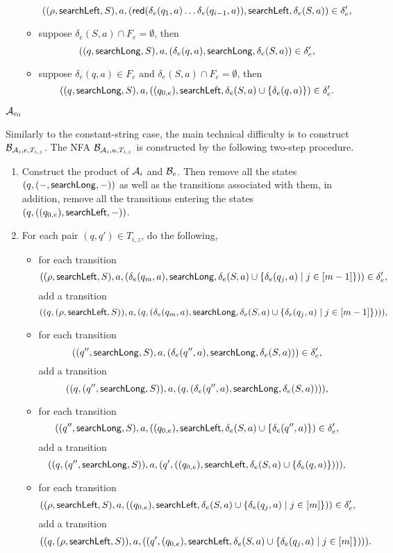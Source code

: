 \begin{itemize}
\begin{itemize}
{		$$((\rho, \mathsf{searchLeft}, S), a, (\mathsf{red}(\delta_e(q_1,a) \dots \delta_e(q_{i-1},a)), \mathsf{searchLeft}, \delta_e(S,a)) \in  \delta'_e,$$ 
%
}
		\item suppose $\delta_e(S,a) \cap F_e = \emptyset$, then 
		$$((q, \mathsf{searchLong}, S), a, (\delta_e(q,a), \mathsf{searchLong}, \delta_e(S,a)) \in \delta'_e,$$
		\item suppose $\delta_e(q,a) \in F_e$ and $\delta_e(S,a) \cap F_e = \emptyset$, then 
		$$((q, \mathsf{searchLong}, S), a, ((q_{0,e}), \mathsf{searchLeft}, \delta_e(S,a) \cup \{\delta_e(q,a)\}) \in \delta'_e.$$
	\end{itemize}
\end{itemize}

\begin{example}
$\mathcal{A}_{e_0}$
\end{example}


Similarly to the constant-string case, the main technical difficulty is to construct $\mathcal{B}_{\mathcal{A}_i, e,  T_{i, z}}$. The NFA $\mathcal{B}_{\mathcal{A}_i, u,  T_{i, z}}$ is constructed by the following two-step procedure.
\begin{enumerate}
\item Construct the product of $\mathcal{A}_i$ and $\mathcal{B}_e$. Then remove all the states $(q, (-, \mathsf{searchLong}, -))$ as well as the transitions associated with them, in addition, remove all the transitions entering the states $(q, ((q_{0,e}), \mathsf{searchLeft},-))$.

\item For each pair $(q,q') \in T_{i,z}$, do the following,
\begin{itemize}
\item for each transition
$$((\rho, \mathsf{searchLeft}, S), a, (\delta_e(q_m, a), \mathsf{searchLong}, \delta_e(S,a) \cup \{\delta_e(q_j, a) \mid j \in [m-1]\})) \in \delta'_e,$$
add a transition
$$((q, (\rho, \mathsf{searchLeft}, S)), a, (q, (\delta_e(q_m, a), \mathsf{searchLong}, \delta_e(S,a) \cup \{\delta_e(q_j, a) \mid j \in [m-1]\}))),$$
%
\item for each transition 
$$((q'', \mathsf{searchLong}, S), a, (\delta_e(q'', a), \mathsf{searchLong}, \delta_e(S,a))) \in \delta'_e,$$  
add a transition 
$$((q, (q'', \mathsf{searchLong}, S)), a, (q, (\delta_e(q'', a), \mathsf{searchLong}, \delta_e(S,a)))),$$
%
\item for each transition
$$((q'', \mathsf{searchLong}, S), a, ((q_{0,e}), \mathsf{searchLeft}, \delta_e(S,a) \cup \{\delta_e(q'',a)\}) \in \delta'_e,$$
add a transition
$$((q, (q'', \mathsf{searchLong}, S)), a, (q', ((q_{0,e}), \mathsf{searchLeft}, \delta_e(S,a) \cup \{\delta_e(q,a)\}))),$$
%
\item for each transition
$$((\rho, \mathsf{searchLeft}, S), a, ((q_{0,e}), \mathsf{searchLeft}, \delta_e(S,a) \cup \{\delta_e(q_j, a) \mid j \in [m]\})) \in \delta'_e,$$
add a transition
$$((q, (\rho, \mathsf{searchLeft}, S)), a, ((q', (q_{0,e}), \mathsf{searchLeft}, \delta_e(S,a) \cup \{\delta_e(q_j, a) \mid j \in [m]\}))).$$
\end{itemize}
\end{enumerate}


